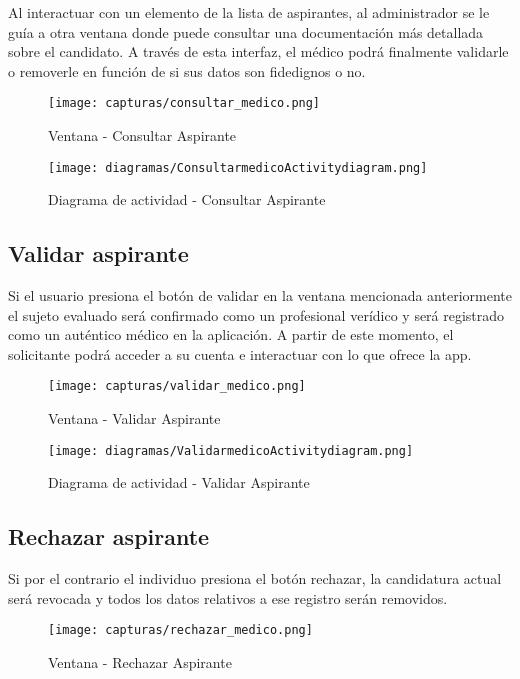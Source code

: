 \documentclass[11pt,spanish,
		listoftables,listoffigures]
		{tfgplantilla}
\begin{document}
Al interactuar con un elemento de la lista de aspirantes, al administrador se le guía a otra ventana donde puede consultar una documentación más detallada sobre el candidato. A través de esta interfaz, el médico podrá finalmente validarle o removerle en función de si sus datos son fidedignos o no. 

\begin{figure}[H]
\centering
\texttt{[image: capturas/consultar\_medico.png]}
\caption{Ventana -  Consultar Aspirante}
\end{figure}

\begin{figure}[H]
\centering
\texttt{[image: diagramas/ConsultarmedicoActivitydiagram.png]}
\caption{Diagrama de actividad -  Consultar Aspirante}
\end{figure}

\subsection {Validar aspirante}

Si el usuario presiona el botón de validar en la ventana mencionada anteriormente el sujeto evaluado será confirmado como un profesional verídico y será registrado como un auténtico médico en la aplicación. A partir de este momento, el solicitante podrá acceder a su cuenta e interactuar con lo que ofrece la app. 

\begin{figure}[H]
\centering
\texttt{[image: capturas/validar\_medico.png]}
\caption{Ventana -  Validar Aspirante}
\end{figure}

\begin{figure}[H]
\centering
\texttt{[image: diagramas/ValidarmedicoActivitydiagram.png]}
\caption{Diagrama de actividad -  Validar Aspirante}
\end{figure}

\subsection {Rechazar aspirante}

Si por el contrario el individuo presiona el botón rechazar, la candidatura actual será revocada y todos los datos relativos a ese registro serán removidos. 

\begin{figure}[H]
\centering
\texttt{[image: capturas/rechazar\_medico.png]}
\caption{Ventana -  Rechazar Aspirante}
\end{figure}
\end{document}
